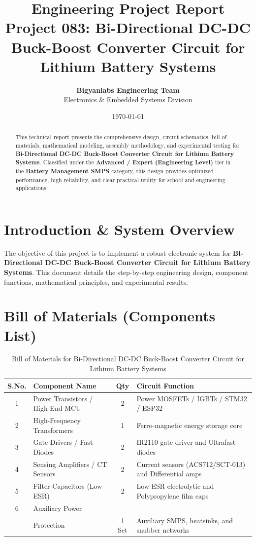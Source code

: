 \documentclass[11pt,a4paper]{article}
\title{\textbf{\Huge Engineering Project Report}\\[0.5em] \Large Project 083: Bi-Directional DC-DC Buck-Boost Converter Circuit for Lithium Battery Systems}
\author{\textbf{Bigyanlabs Engineering Team}\\ Electronics \& Embedded Systems Division}
\date{\today}
\begin{document}
\maketitle
\thispagestyle{empty}

\begin{abstract}
This technical report presents the comprehensive design, circuit schematics, bill of materials, mathematical modeling, assembly methodology, and experimental testing for \textbf{Bi-Directional DC-DC Buck-Boost Converter Circuit for Lithium Battery Systems}. Classified under the \textbf{Advanced / Expert (Engineering Level)} tier in the \textbf{Battery Management SMPS} category, this design provides optimized performance, high reliability, and clear practical utility for school and engineering applications.
\end{abstract}

\newpage
\tableofcontents
\newpage

\section{Introduction \& System Overview}
The objective of this project is to implement a robust electronic system for \textbf{Bi-Directional DC-DC Buck-Boost Converter Circuit for Lithium Battery Systems}. This document details the step-by-step engineering design, component functions, mathematical principles, and experimental results.

\section{Bill of Materials (Components List)}
\begin{table}[h!]
\centering
\caption{Bill of Materials for Bi-Directional DC-DC Buck-Boost Converter Circuit for Lithium Battery Systems}
\vspace{0.5em}
\begin{tabular}{clcp{7cm}}
\toprule
\textbf{S.No.} & \textbf{Component Name} & \textbf{Qty} & \textbf{Circuit Function} \\
\midrule
1 & Power Transistors / High-End MCU & 2 & Power MOSFETs / IGBTs / STM32 / ESP32 \\
2 & High-Frequency Transformers & 1 & Ferro-magnetic energy storage core \\
3 & Gate Drivers / Fast Diodes & 2 & IR2110 gate driver and Ultrafast diodes \\
4 & Sensing Amplifiers / CT Sensors & 2 & Current sensors (ACS712/SCT-013) and Differential amps \\
5 & Filter Capacitors (Low ESR) & 2 & Low ESR electrolytic and Polypropylene film caps \\
6 & Auxiliary Power \\& Protection & 1 Set & Auxiliary SMPS, heatsinks, and snubber networks \\
\bottomrule
\end{tabular}
\end{table}
\end{document}

